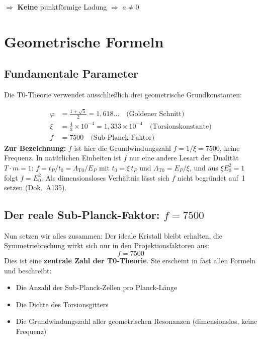 	$\Rightarrow$ \textbf{Keine} punktförmige Ladung $\Rightarrow$ $a \neq 0$
	
	\section{Geometrische Formeln}
	
	\subsection{Fundamentale Parameter}
	
	Die T0-Theorie verwendet ausschließlich drei geometrische Grundkonstanten:
	
	\begin{align}
		\varphi &= \frac{1 + \sqrt{5}}{2} = 1{,}618\ldots \quad \text{(Goldener Schnitt)} \\
		\xi &= \frac{4}{3} \times 10^{-4} = 1{,}333 \times 10^{-4} \quad \text{(Torsionskonstante)} \\
		f &= 7500 \quad \text{(Sub-Planck-Faktor)}
	\end{align}
	\textbf{Zur Bezeichnung:} $f$ ist hier die Grundwindungszahl $f = 1/\xi = 7500$, keine Frequenz. In natürlichen Einheiten ist $f$ nur eine andere Lesart der Dualität $T\cdot m = 1$: $f = t_P/t_0 = \Lambda_{\text{T0}}/E_P$ mit $t_0 = \xi\,t_P$ und $\Lambda_{\text{T0}} = E_P/\xi$, und aus $\xi E_0^2 = 1$ folgt $f = E_0^2$. Als dimensionsloses Verhältnis lässt sich $f$ nicht begründet auf~1 setzen (Dok.~A135).
	\subsection{Der reale Sub-Planck-Faktor: \(f = 7500\)}
	Nun setzen wir alles zusammen: Der ideale Kristall bleibt erhalten, die Symmetriebrechung wirkt sich nur in den Projektionsfaktoren aus:
	\begin{equation}
		\boxed{f = 7500}
	\end{equation}
	Dies ist eine \textbf{zentrale Zahl der T0-Theorie}. Sie erscheint in fast allen Formeln und beschreibt:
	\begin{itemize}
		\item Die Anzahl der Sub-Planck-Zellen pro Planck-Länge
		\item Die Dichte des Torsionsgitters
		\item Die Grundwindungszahl aller geometrischen Resonanzen (dimensionslos, keine Frequenz)
	\end{itemize}
